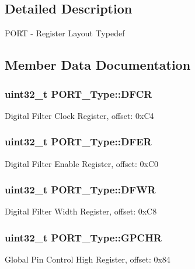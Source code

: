 \subsection{Detailed Description}
P\+O\+RT -\/ Register Layout Typedef 

\subsection{Member Data Documentation}
\subsubsection[{\texorpdfstring{D\+F\+CR}{DFCR}}]{ uint32\+\_\+t P\+O\+R\+T\+\_\+\+Type\+::\+D\+F\+CR}\hypertarget{structPORT__Type_a8d4e0a725169fa8fe22fe55a3d3311a0}{}\label{structPORT__Type_a8d4e0a725169fa8fe22fe55a3d3311a0}
Digital Filter Clock Register, offset\+: 0x\+C4 
\subsubsection[{\texorpdfstring{D\+F\+ER}{DFER}}]{ uint32\+\_\+t P\+O\+R\+T\+\_\+\+Type\+::\+D\+F\+ER}\hypertarget{structPORT__Type_a5fd39916c06d54202f0dc1a50b5e1041}{}\label{structPORT__Type_a5fd39916c06d54202f0dc1a50b5e1041}
Digital Filter Enable Register, offset\+: 0x\+C0 
\subsubsection[{\texorpdfstring{D\+F\+WR}{DFWR}}]{ uint32\+\_\+t P\+O\+R\+T\+\_\+\+Type\+::\+D\+F\+WR}\hypertarget{structPORT__Type_af58c3f35d9f1036282d4e4edabfb77c2}{}\label{structPORT__Type_af58c3f35d9f1036282d4e4edabfb77c2}
Digital Filter Width Register, offset\+: 0x\+C8 
\subsubsection[{\texorpdfstring{G\+P\+C\+HR}{GPCHR}}]{ uint32\+\_\+t P\+O\+R\+T\+\_\+\+Type\+::\+G\+P\+C\+HR}\hypertarget{structPORT__Type_adb92b388adf5799a5a59817ae6cbf7d1}{}\label{structPORT__Type_adb92b388adf5799a5a59817ae6cbf7d1}
Global Pin Control High Register, offset\+: 0x84 
